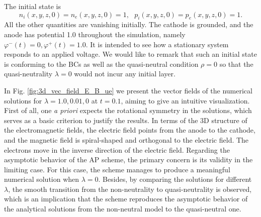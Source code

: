 \documentclass{article}
\begin{document}
The initial state is
\begin{equation*}
    n_i(x,y,z,0) = n_e(x,y,z,0) = 1, \ \ \  p_i(x,y,z,0) = p_e(x,y,z,0) = 1.
\end{equation*}
All the other quantities are vanishing initially. The cathode is grounded, and the anode has potential 1.0 throughout the simulation, namely $\varphi^-(t) = 0, \varphi^+(t) = 1.0$. It is intended to see how a stationary system responds to an applied voltage. We would like to remark that such an initial state is conforming to the BCs as well as the quasi-neutral condition $\rho = 0$ so that the quasi-neutrality $\lambda  = 0$ would not incur any initial layer. 

In Fig. \ref{fig:3d_vec_field_E_B_ue} we present the vector fields of the numerical solutions for $\lambda = 1.0, 0.01, 0$ at $t = 0.1$, aiming to give an intuitive visualization. First of all, one \emph{a priori} expects the rotational symmetry in the solutions, which serves as a basic criterion to justify the results. In terms of the 3D structure of the electromagnetic fields, the electric field points from the anode to the cathode, and the magnetic field is spiral-shaped and orthogonal to the electric field. The electrons move in the inverse direction of the electric field. Regarding the asymptotic behavior of the AP scheme, the primary concern is its validity in the limiting case. For this case, the scheme manages to produce a meaningful numerical solution when $\lambda = 0$. Besides, by comparing the solutions for different $\lambda$, the smooth transition from the non-neutrality to quasi-neutrality is observed, which is an implication that the scheme reproduces the asymptotic behavior of the analytical solutions from the non-neutral model to the quasi-neutral one.
\end{document}
